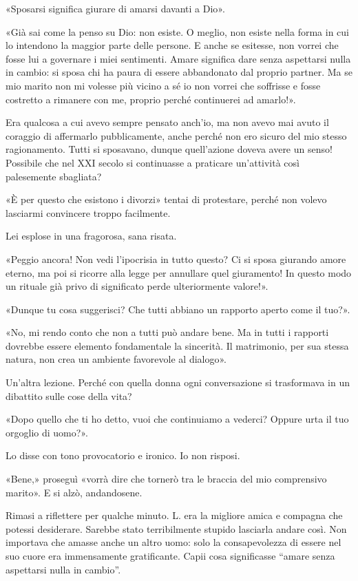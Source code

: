 \documentclass[a4paper,12pt]{book}
\begin{document}
«Sposarsi significa giurare di amarsi davanti a Dio».

«Già sai come la penso su Dio: non esiste. O meglio, non esiste nella forma in
cui lo intendono la maggior parte delle persone. E anche se esitesse, non vorrei
che fosse lui a governare i miei sentimenti. Amare significa dare senza
aspettarsi nulla in cambio: si sposa chi ha paura di essere abbandonato dal
proprio partner. Ma se mio marito non mi volesse più vicino a sé io non vorrei
che soffrisse e fosse costretto a rimanere con me, proprio perché continuerei ad
amarlo!».

Era qualcosa a cui avevo sempre pensato anch'io, ma non avevo mai avuto il
coraggio di affermarlo pubblicamente, anche perché non ero sicuro del mio stesso
ragionamento. Tutti si sposavano, dunque quell'azione doveva avere un senso!
Possibile che nel XXI secolo si continuasse a praticare un'attività così
palesemente sbagliata?

«È per questo che esistono i divorzi» tentai di protestare, perché non volevo
lasciarmi convincere troppo facilmente.

Lei esplose in una fragorosa, sana risata.

«Peggio ancora! Non vedi l'ipocrisia in tutto questo? Ci si sposa giurando amore
eterno, ma poi si ricorre alla legge per annullare quel giuramento! In questo
modo un rituale già privo di significato perde ulteriormente valore!».

«Dunque tu cosa suggerisci? Che tutti abbiano un rapporto aperto come il tuo?».

«No, mi rendo conto che non a tutti può andare bene. Ma in tutti i rapporti
dovrebbe essere elemento fondamentale la sincerità. Il matrimonio, per sua
stessa natura, non crea un ambiente favorevole al dialogo».

Un'altra lezione. Perché con quella donna ogni conversazione si trasformava in
un dibattito sulle cose della vita?

«Dopo quello che ti ho detto, vuoi che continuiamo a vederci? Oppure urta il tuo
orgoglio di uomo?».

Lo disse con tono provocatorio e ironico. Io non risposi.

«Bene,» proseguì «vorrà dire che tornerò tra le braccia del mio comprensivo
marito». E si alzò, andandosene.

Rimasi a riflettere per qualche minuto. L. era la migliore amica e compagna che
potessi desiderare. Sarebbe stato terribilmente stupido lasciarla andare così.
Non importava che amasse anche un altro uomo: solo la consapevolezza di essere
nel suo cuore era immensamente gratificante. Capii cosa significasse ``amare
senza aspettarsi nulla in cambio''.
\end{document}
